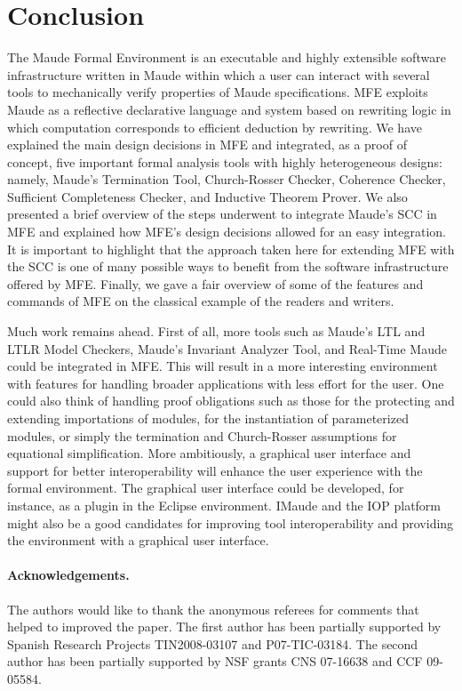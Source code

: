 \section{Conclusion}
\label{sec.concl}

The Maude Formal Environment is
an executable and highly extensible software infrastructure written in Maude
within which a user can interact with several 
tools to mechanically verify properties of Maude specifications.
MFE exploits Maude as a reflective declarative language and system based on 
rewriting logic in which computation corresponds to efficient deduction by rewriting.
We have explained the main design decisions in MFE and integrated, as a proof
of concept, five important formal analysis tools with highly heterogeneous designs: 
namely, Maude's Termination Tool, Church-Rosser Checker, Coherence Checker, Sufficient 
Completeness Checker, and Inductive Theorem Prover.
We also presented a brief overview of 
the steps underwent to integrate Maude's SCC in MFE and explained
how MFE's design decisions allowed for an easy integration. 
It is important to highlight that the approach taken here for extending MFE with the SCC
is one of many possible ways to benefit from the software infrastructure offered by MFE.
Finally, we gave a fair overview of some of the features and commands of 
MFE on the classical example of the readers and writers.

Much work remains ahead. First of all, more tools such as Maude's LTL and LTLR Model Checkers,
Maude's Invariant Analyzer Tool, and Real-Time Maude could be integrated in MFE.
This will result in a more interesting environment with features for handling
broader applications with less effort for the user. One could also think of handling proof obligations such as those for the protecting and extending importations of modules, for the instantiation of parameterized modules, or simply the termination and Church-Rosser assumptions for equational simplification. More ambitiously, a graphical
user interface and support for better interoperability will enhance the
user experience with the formal environment. The graphical user interface could be
developed, for instance, as a plugin in the Eclipse environment. 
IMaude and the IOP platform might also be a good candidates for improving 
tool interoperability and providing the environment with a graphical user interface.

\paragraph{\bf Acknowledgements.} The authors would like to thank the anonymous
referees for comments that helped to improved the paper. 
The first author has been partially supported by 
Spanish Research Projects TIN2008-03107 and P07-TIC-03184.
The second author has been partially supported by 
NSF grants CNS 07-16638 and CCF 09-05584.
